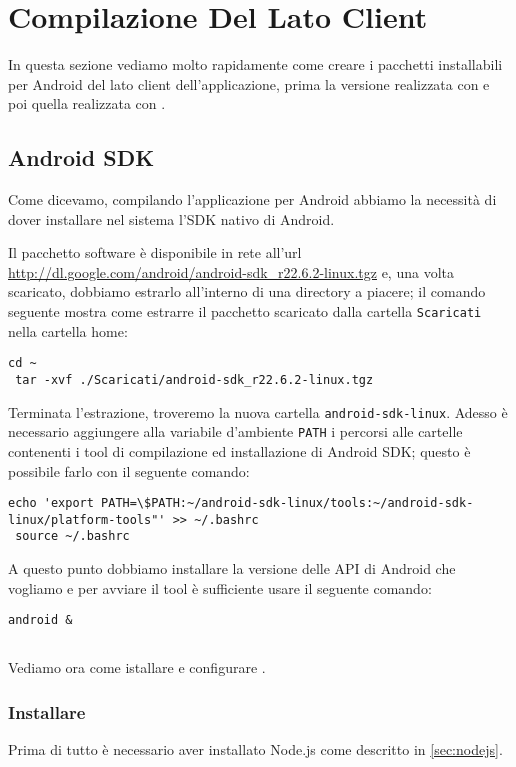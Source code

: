 \chapter{Compilazione Del Lato Client}

In questa sezione vediamo molto rapidamente come creare i pacchetti installabili
per Android del lato client dell'applicazione, prima la versione realizzata con
\pg{} e poi quella realizzata con \tisdk{}.

\section{Android SDK}
    Come dicevamo, compilando l'applicazione per Android abbiamo la necessità di
    dover installare nel sistema l'SDK nativo di Android.
    
    Il pacchetto software è disponibile in rete all'url
    \url{http://dl.google.com/android/android-sdk_r22.6.2-linux.tgz} e, una
    volta scaricato, dobbiamo estrarlo all'interno di una directory a piacere;
    il comando seguente mostra come estrarre il pacchetto scaricato dalla 
    cartella \texttt{Scaricati} nella cartella home:
    \begin{lstlisting}[language=plane]
 cd ~
 tar -xvf ./Scaricati/android-sdk_r22.6.2-linux.tgz
    \end{lstlisting}
    Terminata l'estrazione, troveremo la nuova cartella
    \texttt{android-sdk-linux}. Adesso è necessario aggiungere alla 
    variabile d'ambiente \texttt{PATH} i percorsi alle cartelle contenenti i 
    tool di compilazione ed installazione di Android SDK; questo è possibile 
    farlo con il seguente comando:
    \begin{lstlisting}[language=plane]
 echo 'export PATH=\$PATH:~/android-sdk-linux/tools:~/android-sdk-linux/platform-tools"' >> ~/.bashrc
 source ~/.bashrc
    \end{lstlisting}
    A questo punto dobbiamo installare la versione delle API di Android che 
    vogliamo e per avviare il tool è sufficiente usare il seguente comando:
    \begin{lstlisting}[language=plane]
    android &
    \end{lstlisting}
     

\section{\pg{}}
    Vediamo ora come istallare e configurare \pg{}.
    
    \subsection{Installare \pg{}}
        Prima di tutto è necessario aver installato Node.js come descritto in 
        \ref{sec:nodejs}.
        
